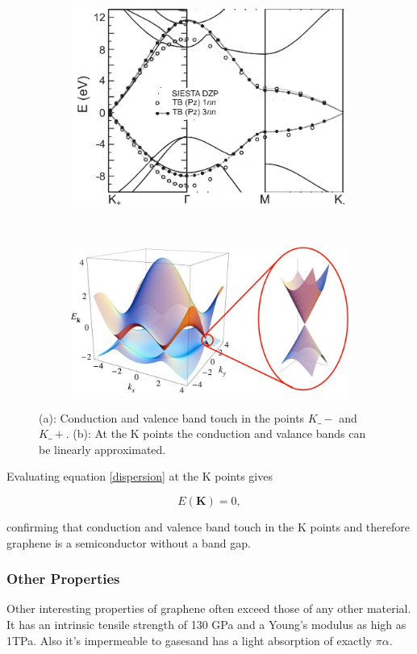 \begin{figure}[!h]
  \centering
  \begin{subfigure}[b]{0.4\textwidth}
    \caption{}
    \includegraphics[width=\textwidth]{./images/band-2d.png}
  \end{subfigure}
  ~
  \begin{subfigure}[b]{0.4\textwidth}
    \caption{}
    \includegraphics[width=\textwidth]{./images/dispersion.png}
  \end{subfigure}
  \caption { (a): Conduction and valence band touch in the points $K\_-$ and $K\_+$. (b): At the K points the conduction and valance bands can be linearly approximated. }
\end{figure}

Evaluating equation \ref{dispersion} at the K points gives

\begin{equation}
  E(\mathbf{K})=0,
\end{equation}

confirming that conduction and valence band touch in the K points and therefore graphene is a semiconductor without a band gap.

\subsubsection{Other Properties}

Other interesting properties of graphene often exceed those of any other material. It has an intrinsic tensile strength of 130 GPa and a Young's modulus as high as 1TPa\mcite. Also it's impermeable to gases\mcite and has a light absorption of exactly $\pi\alpha$\mcite.
